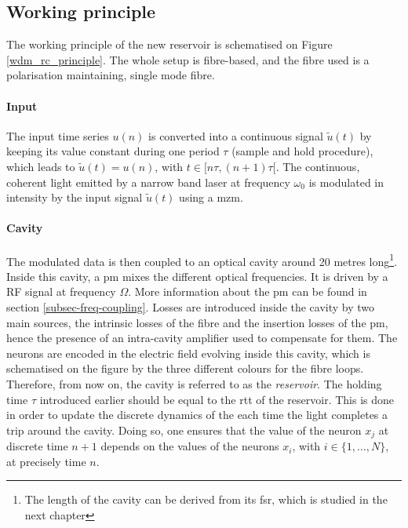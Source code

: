 
\subsection{Working principle}

The working principle of the new reservoir is schematised on Figure \ref{wdm_rc_principle}. The whole setup is fibre-based, and the fibre used is a polarisation maintaining, single mode fibre. 

\paragraph{Input}

The input time series $u(n)$ is converted into a continuous signal $\tilde{u}(t)$ by keeping its value constant during one period $\tau$ (sample and hold procedure), which leads to $\tilde{u}(t)=u(n)$, with $t \in [n\tau, (n+1)\tau[$. The continuous, coherent light emitted by a narrow band laser at frequency $\omega_0$ is modulated in intensity by the input signal $\tilde{u}(t)$ using a \gls{mzm}.  

\paragraph{Cavity}

The modulated data is then coupled to an optical cavity around 20 metres long\footnote{The length of the cavity can be derived from its \gls{fsr}, which is studied in the next chapter}. Inside this cavity, a \gls{pm} mixes the different optical frequencies. It is driven by a RF signal at frequency $\Omega$. More information about the \gls{pm} can be found in section \ref{subsec-freq-coupling}. Losses are introduced inside the cavity by two main sources, the intrinsic losses of the fibre and the insertion losses of the \gls{pm}, hence the presence of an intra-cavity amplifier used to compensate for them. The neurons are encoded in the electric field evolving inside this cavity, which is schematised on the figure by the three different colours for the fibre loops. Therefore, from now on, the cavity is referred to as the \textit{reservoir}. The holding time $\tau$ introduced earlier should be equal to the \gls{rtt} of the reservoir. This is done in order to update the discrete dynamics of the \rcer each time the light completes a trip around the cavity. Doing so, one ensures that the value of the neuron $x_j$ at discrete time $n+1$ depends on the values of the neurons $x_i$, with $i \in \{1,\dots, N\}$, at precisely time $n$. 


